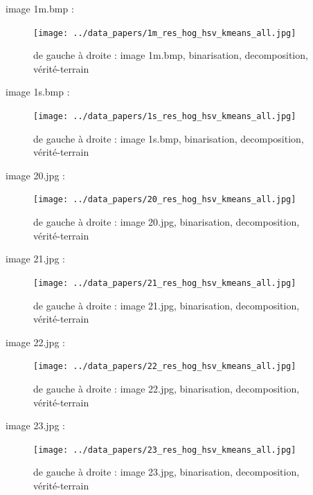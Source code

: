 \documentclass{book}
\begin{document}
image 1m.bmp : 
\begin{figure}[H]
\begin{center}
\texttt{[image: ../data\_papers/1m\_res\_hog\_hsv\_kmeans\_all.jpg]}
\end{center}
\caption{de gauche à droite : image 1m.bmp, binarisation, decomposition, vérité-terrain}
\label{1m}
\end{figure}
\clearpage


image 1s.bmp : 
\begin{figure}[H]
\begin{center}
\texttt{[image: ../data\_papers/1s\_res\_hog\_hsv\_kmeans\_all.jpg]}
\end{center}
\caption{de gauche à droite : image 1s.bmp, binarisation, decomposition, vérité-terrain}
\label{1s}
\end{figure}
\clearpage


image 20.jpg : 
\begin{figure}[H]
\begin{center}
\texttt{[image: ../data\_papers/20\_res\_hog\_hsv\_kmeans\_all.jpg]}
\end{center}
\caption{de gauche à droite : image 20.jpg, binarisation, decomposition, vérité-terrain}
\label{20}
\end{figure}
\clearpage


image 21.jpg : 
\begin{figure}[H]
\begin{center}
\texttt{[image: ../data\_papers/21\_res\_hog\_hsv\_kmeans\_all.jpg]}
\end{center}
\caption{de gauche à droite : image 21.jpg, binarisation, decomposition, vérité-terrain}
\label{21}
\end{figure}
\clearpage


image 22.jpg : 
\begin{figure}[H]
\begin{center}
\texttt{[image: ../data\_papers/22\_res\_hog\_hsv\_kmeans\_all.jpg]}
\end{center}
\caption{de gauche à droite : image 22.jpg, binarisation, decomposition, vérité-terrain}
\label{22}
\end{figure}
\clearpage


image 23.jpg : 
\begin{figure}[H]
\begin{center}
\texttt{[image: ../data\_papers/23\_res\_hog\_hsv\_kmeans\_all.jpg]}
\end{center}
\caption{de gauche à droite : image 23.jpg, binarisation, decomposition, vérité-terrain}
\label{23}
\end{figure}
\clearpage
\end{document}
